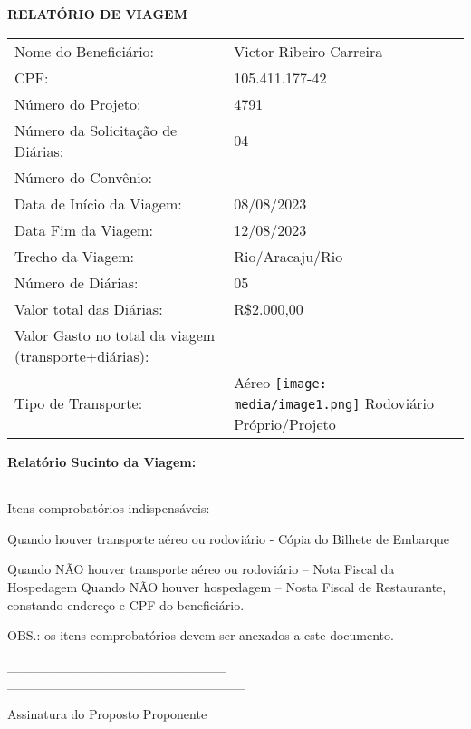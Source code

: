 \textbf{{RELATÓRIO DE VIAGEM}}

{}

\begin{longtable}[]{@{}ll@{}}
\toprule
\endhead
Nome do Beneficiário: & Victor Ribeiro Carreira\tabularnewline
CPF: & 105.411.177-42\tabularnewline
Número do Projeto: & 4791\tabularnewline
Número da Solicitação de Diárias: & 04\tabularnewline
Número do Convênio: &\tabularnewline
Data de Início da Viagem: & 08/08/2023\tabularnewline
Data Fim da Viagem: & 12/08/2023\tabularnewline
Trecho da Viagem: & Rio/Aracaju/Rio\tabularnewline
Número de Diárias: & 05\tabularnewline
Valor total das Diárias: & R\$2.000,00\tabularnewline
Valor Gasto no total da viagem (transporte+diárias): &\tabularnewline
Tipo de Transporte: & Aéreo
\texttt{[image: media/image1.png]}
Rodoviário Próprio/Projeto\tabularnewline
\bottomrule
\end{longtable}

\textbf{Relatório Sucinto da Viagem:}

\begin{longtable}[]{@{}l@{}}
\toprule
\endhead
\tabularnewline
\bottomrule
\end{longtable}

Itens comprobatórios indispensáveis:

Quando houver transporte aéreo ou rodoviário - Cópia do Bilhete de
Embarque

Quando NÃO houver transporte aéreo ou rodoviário -- Nota Fiscal da
Hospedagem Quando NÃO houver hospedagem -- Nosta Fiscal de Restaurante,
constando endereço e CPF do beneficiário.

OBS.: os itens comprobatórios devem ser anexados a este documento.

\_\_\_\_\_\_\_\_\_\_\_\_\_\_\_\_\_\_\_\_\_\_\_
\_\_\_\_\_\_\_\_\_\_\_\_\_\_\_\_\_\_\_\_\_\_\_\_\_

Assinatura do Proposto Proponente
